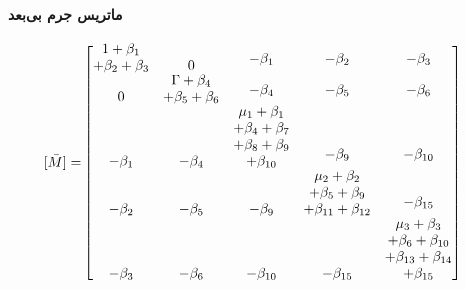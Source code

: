 \paragraph{ماتریس جرم بی‌بعد}
\begin{equation}\label{Eq.mass_matrix_dimensionless}
\begin{aligned}
[\bar{M}] =& 
\begin{bmatrix}
\shortstack{$1 + \beta_1$ \\ $+ \beta_2 + \beta_3$} & 0 & \shortstack{$-\beta_1$ \\ \,} & \shortstack{$-\beta_2$ \\ \,} & \shortstack{$-\beta_3$ \\ \,} \\
0 & \shortstack{$\Gamma + \beta_4$ \\ $+ \beta_5 + \beta_6$} & \shortstack{$-\beta_4$ \\ \,} & \shortstack{$-\beta_5$ \\ \,} & \shortstack{$-\beta_6$ \\ \,} \\
-\beta_1 & -\beta_4 & \shortstack{$\mu_1 + \beta_1$ \\ $+ \beta_4 + \beta_7$ \\ $+ \beta_8 + \beta_9$ \\ $+ \beta_{10}$} & \shortstack{$-\beta_9$ \\ \,} & \shortstack{$-\beta_{10}$ \\ \,} \\
-\beta_2 & -\beta_5 & -\beta_9 & \shortstack{$\mu_2 + \beta_2$ \\ $+ \beta_5 + \beta_9$ \\ $+ \beta_{11} + \beta_{12}$} & \shortstack{$-\beta_{15}$ \\ \,} \\
-\beta_3 & -\beta_6 & -\beta_{10} & -\beta_{15} & \shortstack{$\mu_3 + \beta_3$ \\ $+ \beta_6 + \beta_{10}$ \\ $+ \beta_{13} + \beta_{14}$ \\ $+ \beta_{15}$}
\end{bmatrix}
\end{aligned}
\end{equation}
